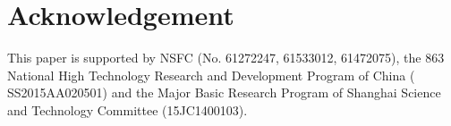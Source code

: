\documentclass{article}
\begin{document}
\section{Acknowledgement}

This paper is supported by NSFC (No. 61272247, 61533012, 61472075), the 863 National High Technology Research and Development Program of China ( SS2015AA020501) and the Major Basic Research Program of Shanghai Science and Technology Committee (15JC1400103).



\end{document}

